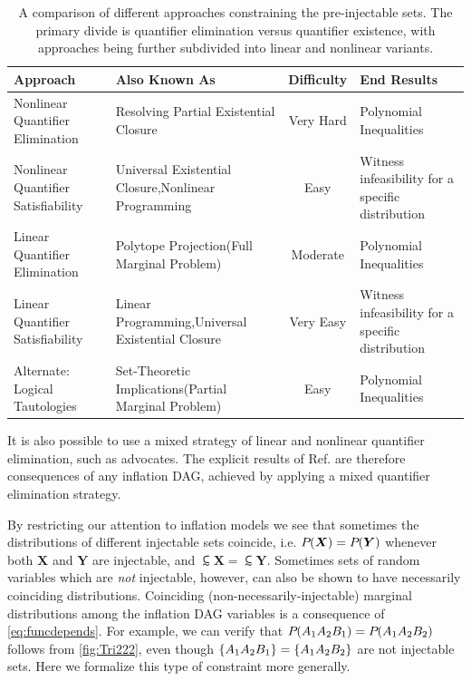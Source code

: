\begin{asparadesc}
\begin{table}[ht]\centering\caption{A comparison of different approaches constraining the pre-injectable sets. The primary divide is quantifier elimination versus quantifier existence, with approaches being further subdivided into linear and nonlinear variants.}
\begin{tabularx}{\linewidth}{ |l|L|c|L| } 
\hline
Approach & Also Known As & Difficulty & End Results \\
\bottomrule
Nonlinear Quantifier Elimination & Resolving Partial Existential Closure & Very Hard & Polynomial Inequalities \\
\hline
Nonlinear Quantifier Satisfiability & Universal Existential Closure,\newline Nonlinear Programming & Easy & Witness infeasibility for a specific distribution \\
\hline
Linear Quantifier Elimination & Polytope Projection\newline (Full Marginal Problem) & Moderate & Polynomial Inequalities \\
\hline
Linear Quantifier Satisfiability & Linear Programming,\newline Universal Existential Closure & Very Easy & Witness infeasibility for a specific distribution \\
\hline
Alternate: Logical Tautologies & Set-Theoretic Implications\newline (Partial Marginal Problem) & Easy & Polynomial Inequalities 
\\\toprule
\end{tabularx}
\end{table}

It is also possible to use a mixed strategy of linear and nonlinear quantifier elimination, such as \citet{ChavesPolynomial} advocates. The explicit results of Ref. \cite{ChavesPolynomial} are therefore consequences of any inflation DAG, achieved by applying a mixed quantifier elimination strategy.

\medskip\item[\tred{Coinciding Marginal Distributions}] \noindent
\par\hspace{\parskip}
By restricting our attention to inflation models we see that sometimes the distributions of different injectable sets coincide, i.e. 
${P_{}}\lparen\bm{X}\rparen={P_{}}\lparen\bm{Y}\rparen$ whenever both $\bm{X}$ and $\bm{Y}$ are injectable, and $\subsim{\bm{X}}=\subsim{\bm{Y}}$. Sometimes sets of random variables which are \emph{not} injectable, however, can also be shown to have necessarily coinciding distributions. Coinciding (non-necessarily-injectable) marginal distributions among the inflation DAG variables is a consequence of \cref{eq:funcdepends}. For example, we can verify that ${P_{}}\lparen A_1 A_2 B_1\rparen={P_{}}\lparen A_1 A_2 B_2\rparen$ follows from \cref{fig:Tri222}, even though $\left\lbrace A_1 A_2 B_1\right\rbrace=\left\lbrace A_1 A_2 B_2\right\rbrace$ are not injectable sets. Here we formalize this type of constraint more generally.


\end{asparadesc}
